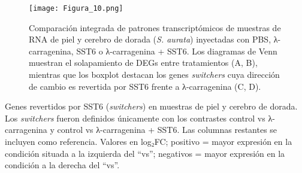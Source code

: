 \documentclass[10pt,a4paper]{article}
\begin{document}
\begin{figure}[ht]
  \centering
 \texttt{[image: Figura\_10.png]}
 
  \caption{Comparación integrada de patrones transcriptómicos de muestras de RNA de piel y cerebro de dorada (\textit{S. aurata}) inyectadas con PBS, λ-carragenina, SST6 o λ-carragenina + SST6. Los diagramas de Venn muestran el solapamiento de DEGs entre tratamientos (A, B), mientras que los boxplot destacan los genes \textit{switchers} cuya dirección de cambio es revertida por SST6 frente a λ-carragenina (C, D).}
  \label{fig:10}
\end{figure}


\begin{table}[ht]
  \centering
  \caption{Genes revertidos por SST6 (\textit{switchers}) en muestras de piel y cerebro de dorada. Los \textit{switchers} fueron definidos únicamente con los contrastes control vs λ-carragenina y control vs λ-carragenina + SST6. Las columnas restantes se incluyen como referencia. Valores en log₂FC; positivo = mayor expresión en la condición situada a la izquierda del “vs”; negativos = mayor expresión en la condición a la derecha del “vs”.}
  \label{tab:tabla_3}

  {\small
  \setlength{\tabcolsep}{1pt}
  \renewcommand{\arraystretch}{1.05}

}
\end{table}
\end{document}
